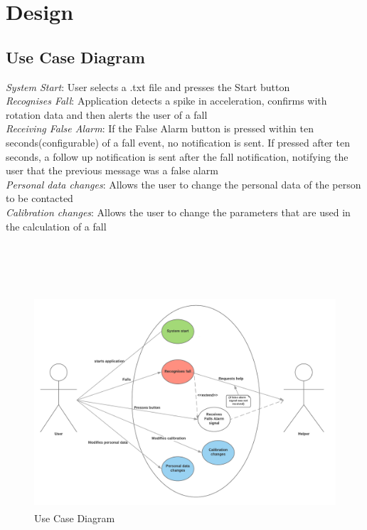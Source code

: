 \documentclass[hidelinks,conference,12pt]{IEEETran}
\begin{document}
\clearpage

\section{Design}
\subsection{Use Case Diagram}

\textit{System Start}: User selects a .txt file and presses the Start button\\
\textit{Recognises Fall}: Application detects a spike in acceleration, confirms with rotation data and then alerts the user of a fall\\
\textit{Receiving False Alarm}: If the False Alarm button is pressed within ten seconds(configurable) of a fall event, no notification is sent. If pressed after ten seconds, a follow up notification is sent after the fall notification, notifying the user that the previous message was a false alarm\\
\textit{Personal data changes}: Allows the user to change the personal data of the person to be contacted\\
\textit{Calibration changes}:  Allows the user to change the parameters that are used in the calculation of a fall\\\\\\\\\\

\FloatBarrier
\begin{figure}[!h]
	\centering
	\includegraphics[scale=0.23]{images/Use_Case_Diag.png}
	\caption{Use Case Diagram\textsuperscript{\cite{umlspec}}}
	\label{img:Use_Diag}
\end{figure}
\FloatBarrier
\vskip 3cm
\end{document}

